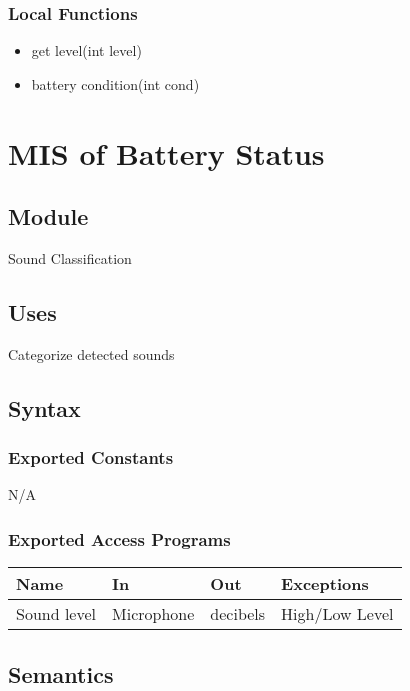\documentclass[12pt, titlepage]{article}
\begin{document}
\subsubsection{Local Functions}
\begin{itemize}
\item get level(int level)
\item battery condition(int cond)
\end{itemize}

\section{MIS of Battery Status} \label{Module}

\subsection{Module}

Sound Classification

\subsection{Uses}

Categorize detected sounds

\subsection{Syntax}

\subsubsection{Exported Constants}

N/A

\subsubsection{Exported Access Programs}

\begin{center}
\begin{tabular}{p{2cm} p{4cm} p{4cm} p{2cm}}
\hline
\textbf{Name} & \textbf{In} & \textbf{Out} & \textbf{Exceptions} \\
\hline
Sound level & Microphone & decibels & High/Low Level \\
\hline
\end{tabular}
\end{center}

\subsection{Semantics}
\end{document}
